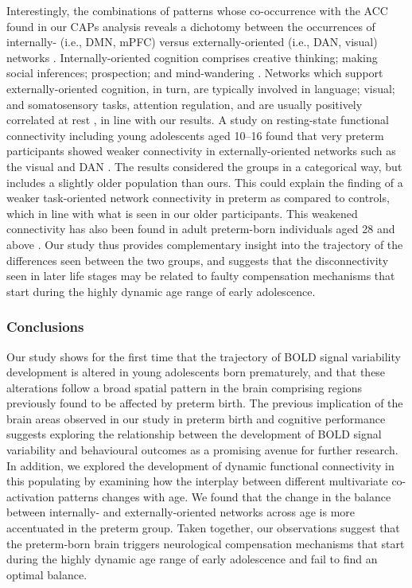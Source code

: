 Interestingly, the combinations of patterns whose co-occurrence with the ACC found in our CAPs analysis reveals a dichotomy between the occurrences of internally- (i.e., DMN, mPFC) versus externally-oriented (i.e., DAN, visual) networks \citep{Zabelina2016}. Internally-oriented cognition comprises creative thinking; making social inferences; prospection; and mind-wandering \citep{Zabelina2016, Buckner2019}. Networks which support externally-oriented cognition, in turn, are typically involved in language; visual; and somatosensory tasks, attention regulation, and are usually positively correlated at rest \citep{Lee2012}, in line with our results. A study on resting-state functional connectivity including young adolescents aged 10--16 found that very preterm participants showed weaker connectivity in externally-oriented networks such as the visual and DAN \citep{Wehrle2018}. The results considered the groups in a categorical way, but includes a slightly older population than ours. This could explain the finding of a weaker task-oriented network connectivity in preterm as compared to controls, which in line with what is seen in our older participants. This weakened connectivity has also been found in adult preterm-born individuals aged 28 and above \citep{White2014}. Our study thus provides complementary insight into the trajectory of the differences seen between the two groups, and suggests that the disconnectivity seen in later life stages may be related to faulty compensation mechanisms that start during the highly dynamic age range of early adolescence.


\subsubsection*{Conclusions}
Our study shows for the first time that the trajectory of BOLD signal variability development is altered in young adolescents born prematurely, and that these alterations follow a broad spatial pattern in the brain comprising regions previously found to be affected by preterm birth. The previous implication of the brain areas observed in our study in preterm birth and cognitive performance suggests exploring the relationship between the development of BOLD signal variability and behavioural outcomes as a promising avenue for further research. In addition, we explored the development of dynamic functional connectivity in this populating by examining how the interplay between different multivariate co-activation patterns changes with age. We found that the change in the balance between  internally- and externally-oriented networks across age is more accentuated in the preterm group. Taken together, our observations suggest that the preterm-born brain triggers neurological compensation mechanisms that start during the highly dynamic age range of early adolescence and fail to find an optimal balance. 





